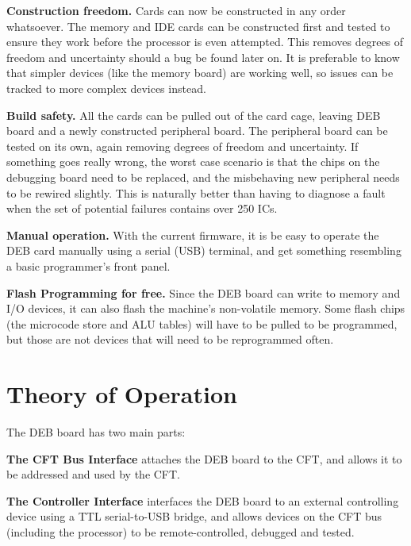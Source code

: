 \begin{description}
\item {\bfseries Construction freedom.} Cards can now be constructed in any
  order whatsoever. The memory and IDE cards can be constructed first
  and tested to ensure they work before the processor is even
  attempted. This removes degrees of freedom and uncertainty should a
  bug be found later on. It is preferable to know that simpler devices
  (like the memory board) are working well, so issues can be tracked
  to more complex devices instead.
  
\item {\bfseries Build safety.} All the cards can be pulled out of the card
  cage, leaving \gls{DEB} board and a newly constructed peripheral
  board. The peripheral board can be tested on its own, again removing
  degrees of freedom and uncertainty. If something goes really wrong,
  the worst case scenario is that the chips on the debugging board
  need to be replaced, and the misbehaving new peripheral needs to be
  rewired slightly. This is naturally better than having to diagnose a
  fault when the set of potential failures contains over 250 ICs.

\item {\bfseries Manual operation.} With the current firmware, it is be easy
  to operate the \gls{DEB} card manually using a serial (\gls{USB})
  terminal, and get something resembling a basic programmer's front
  panel.

\item {\bfseries Flash Programming for free.} Since the \gls{DEB} board can
  write to memory and I/O devices, it can also flash the machine's
  non-volatile memory. Some flash chips (the microcode store and ALU
  tables) will have to be pulled to be programmed, but those are not
  devices that will need to be reprogrammed often.

\end{description}

\section{Theory of Operation}

The DEB board has two main parts:

\begin{description}
\item {\bfseries The CFT Bus Interface} attaches the DEB board to the CFT,
  and allows it to be addressed and used by the CFT.

\item {\bfseries The Controller Interface} interfaces the DEB board to an
  external controlling device using a TTL serial-to-USB bridge, and
  allows devices on the CFT bus (including the processor) to be
  remote-controlled, debugged and tested.
\end{description}

